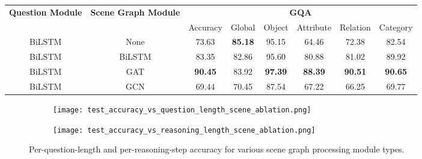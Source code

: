 \begin{table}[htbp]
\centering
\begin{footnotesize}
\begin{tabular}{cc|c|ccccc}
\toprule
\multirow{3}{0.1\textwidth}{\textbf{Question Module}} & \multirow{3}{0.1\textwidth}{\textbf{Scene Graph Module}} & \multicolumn{6}{c}{\multirow{2}{*}{\textbf{GQA}}}                                                   \\
                                          &                                              & \multicolumn{6}{c}{}                                                                                \\ \cmidrule(l){3-8} 
                                          &                                              & Accuracy       & Global         & Object         & Attribute      & Relation       & Category       \\ \midrule
BiLSTM                                    & None                                         & 73.63          & \textbf{85.18} & 95.15          & 64.46          & 72.38          & 82.54          \\
BiLSTM                                    & BiLSTM                                       & 83.35          & 82.86          & 95.60          & 80.88          & 81.02          & 89.92          \\
BiLSTM                                    & GAT                                          & \textbf{90.45} & 83.92          & \textbf{97.39} & \textbf{88.39}          & \textbf{90.51} & \textbf{90.65} \\
BiLSTM                                    & GCN                                          & 69.44          & 70.45          & 87.54          & 67.22          & 66.25          & 69.77          \\
\bottomrule
\end{tabular}
\end{footnotesize}
\end{table}


\begin{figure}[htbp]
    \centering
    \begin{subfigure}[l]{0.5\textwidth}
        \texttt{[image: test\_accuracy\_vs\_question\_length\_scene\_ablation.png]}
        \label{fig:test_accuracy_vs_question_length_scene_ablation}
    \end{subfigure}
    \begin{subfigure}[r]{0.49\textwidth}
        \texttt{[image: test\_accuracy\_vs\_reasoning\_length\_scene\_ablation.png]}
        \label{fig:test_accuracy_vs_reasoning_steps_scene_ablation}
    \end{subfigure}
    \caption{Per-question-length and per-reasoning-step accuracy for various scene graph processing module types.}
\end{figure}

